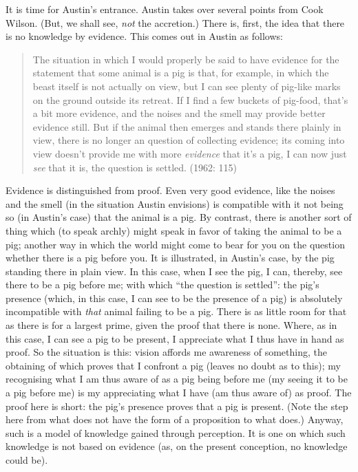 It is time for Austin's entrance. Austin takes over several points from Cook Wilson. (But, we shall see, \emph{not} the accretion.) There is, first, the idea that there is no knowledge by evidence. This comes out in Austin as follows:
\begin{quote}
	The situation in which I would properly be said to have evidence for the statement that some animal is a pig is that, for example, in which the beast itself is not actually on view, but I can see plenty of pig-like marks on the ground outside its retreat. If I find a few buckets of pig-food, that’s a bit more evidence, and the noises and the smell may provide better evidence still. But if the animal then emerges and stands there plainly in view, there is no longer an question of collecting evidence; its coming into view doesn’t provide me with more \emph{evidence} that it’s a pig, I can now just \emph{see} that it is, the question is settled. (1962: 115)
\end{quote}
Evidence is distinguished from proof. Even very good evidence, like the noises and the smell (in the situation Austin envisions) is compatible with it not being so (in Austin’s case) that the animal is a pig. By contrast, there is another sort of thing which (to speak archly) might speak in favor of taking the animal to be a pig; another way in which the world might come to bear for you on the question whether there is a pig before you. It is illustrated, in Austin’s case, by the pig standing there in plain view. In this case, when I see the pig, I can, thereby, see there to be a pig before me; with which ``the question is settled'': the pig’s presence (which, in this case, I can see to be the presence of a pig) is absolutely incompatible with \emph{that} animal failing to be a pig. There is as little room for that as there is for a largest prime, given the proof that there is none. Where, as in this case, I can see a pig to be present, I appreciate what I thus have in hand as proof. So the situation is this: vision affords me awareness of something, the obtaining of which proves that I confront a pig (leaves no doubt as to this); my recognising what I am thus aware of as a pig being before me (my seeing it to be a pig before me) is my appreciating what I have (am thus aware of) as proof. The proof here is short: the pig’s presence proves that a pig is present. (Note the step here from what does not have the form of a proposition to what does.) Anyway, such is a model of knowledge gained through perception. It is one on which such knowledge is not based on evidence (as, on the present conception, no knowledge could be).

